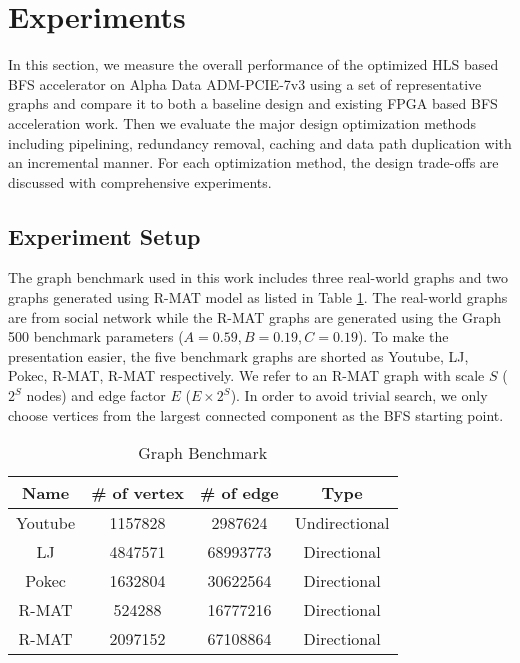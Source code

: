 \section{Experiments} \label{sec:experiment}
In this section, we measure the overall performance of the optimized 
HLS based BFS accelerator on Alpha Data ADM-PCIE-7v3 using a set of 
representative graphs and compare it to both a baseline design 
and existing FPGA based BFS acceleration work. Then we evaluate the major design 
optimization methods including pipelining, redundancy removal,  
caching and data path duplication with an incremental manner. 
For each optimization method, the design trade-offs are discussed with 
comprehensive experiments. 

\subsection{Experiment Setup}
The graph benchmark used in this work includes three real-world graphs and two graphs 
generated using R-MAT model \cite{chakrabarti2004rmat} as listed in 
Table \ref{tab:graph}. The real-world graphs are from social network \cite{yang2012defining, 
leskovec2009community, takac2012data} while the R-MAT graphs are generated 
using the Graph 500 benchmark parameters ($A=0.59, B=0.19, C=0.19$). To make the 
presentation easier, the five benchmark graphs are shorted as Youtube, 
LJ, Pokec, R-MAT\uppercase\expandafter{}, 
R-MAT\uppercase\expandafter{} respectively. We refer 
to an R-MAT graph with scale $S$ ($2^{S}$ nodes) and edge factor $E$ ($E\times 2^{S}$). 
In order to avoid trivial search, we only choose vertices from the largest 
connected component as the BFS starting point.

\begin{table}
    \centering
  \caption{Graph Benchmark}
  \label{tab:graph}
  \begin{tabular}{cccc}
    \toprule
      Name & \# of vertex & \# of edge & Type \\
    \midrule
      Youtube \cite{yang2012defining} & 1157828 & 2987624 & Undirectional \\
      LJ \cite{leskovec2009community} & 4847571 & 68993773 & Directional \\
      Pokec \cite{takac2012data} & 1632804 & 30622564 & Directional \\
      R-MAT\uppercase\expandafter{\romannumeral1} & 524288 & 16777216 & Directional \\
      R-MAT\uppercase\expandafter{\romannumeral2} & 2097152 & 67108864 & Directional \\
  \bottomrule
\end{tabular}
\end{table}

